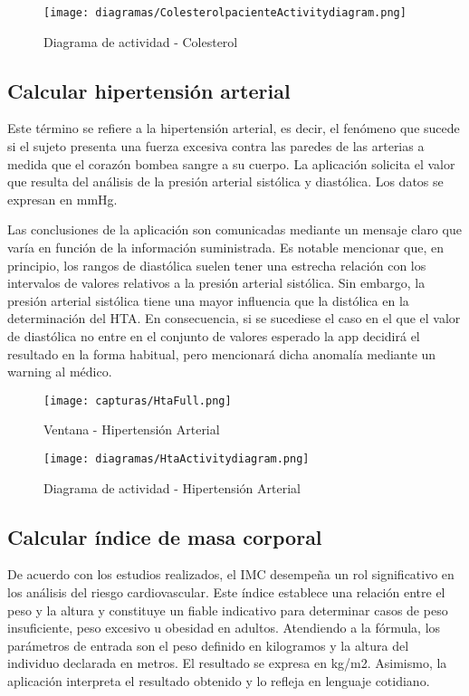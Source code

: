 \documentclass[11pt,spanish,
		listoftables,listoffigures]
		{tfgplantilla}
\begin{document}
\begin{figure}[H]
\centering
\texttt{[image: diagramas/ColesterolpacienteActivitydiagram.png]}
\caption{Diagrama de actividad - Colesterol}
\end{figure}

\subsection {Calcular hipertensión arterial}

Este término se refiere a la hipertensión arterial, es decir, el fenómeno que sucede si el sujeto presenta una fuerza excesiva contra las paredes de las arterias a medida que el corazón bombea sangre a su cuerpo.
La aplicación solicita el valor que resulta del análisis de la presión arterial sistólica y diastólica. Los datos se expresan en mmHg.

Las conclusiones de la aplicación son comunicadas mediante un mensaje claro que varía en función de la información suministrada.
Es notable mencionar que, en principio, los rangos de diastólica suelen tener una estrecha relación con los intervalos de valores relativos a la presión arterial sistólica. Sin embargo, la presión arterial sistólica tiene una mayor influencia que la distólica en la determinación del HTA. En consecuencia, si se sucediese el caso en el que el valor de diastólica no entre en el conjunto de valores esperado la app decidirá el resultado en la forma habitual, pero mencionará dicha anomalía mediante un warning al médico.

\begin{figure}[H]
\centering
\texttt{[image: capturas/HtaFull.png]}
\caption{Ventana - Hipertensión Arterial}
\end{figure}

\newpage
\begin{figure}[H]
\centering
\texttt{[image: diagramas/HtaActivitydiagram.png]}
\caption{Diagrama de actividad - Hipertensión Arterial}
\end{figure}

\newpage
\subsection {Calcular índice de masa corporal}

De acuerdo con los estudios realizados, el IMC desempeña un rol significativo en los análisis del riesgo cardiovascular. Este índice establece una relación entre el peso y la altura y constituye un fiable indicativo para determinar casos de peso insuficiente, peso excesivo u obesidad en adultos. 
Atendiendo a la fórmula, los parámetros de entrada son el peso definido en kilogramos y la altura del individuo declarada en metros. El resultado se expresa en kg/m2. Asimismo, la aplicación interpreta el resultado obtenido y lo refleja en lenguaje cotidiano.
\end{document}
